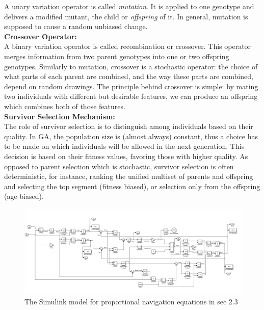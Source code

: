 A unary variation operator is called \textit{mutation}. It is applied to one genotype and delivers a modified mutant, the child or \textit{offspring} of it.
In general, mutation is supposed to cause a random unbiased change. 
\\
\textbf{Crossover Operator:}\\
A binary variation operator is called recombination or crossover. This operator merges information from two parent genotypes into one or two offspring genotypes.
Similarly to mutation, crossover is a stochastic operator: the choice of what parts of each parent are combined, and the way these parts are combined, depend on random drawings.
The principle behind crossover is simple: by mating two individuals with different but desirable features, we can produce an offspring which combines both of those features.
\\
\textbf{Survivor Selection Mechanism:}\\
The role of survivor selection is to distinguish among individuals based on their quality. In GA, the population size is (almost always) constant, thus a choice has to be made on which individuals will be allowed in the next generation. This decision is based on their fitness values, favoring those with higher quality.
As opposed to parent selection which is stochastic, survivor selection is often deterministic, for instance, ranking the unified multiset of parents and offspring and selecting the top segment (fitness biased), or selection only from the offspring (age-biased).
\\


\begin{landscape}
\begin{figure}[H]
	\centering
	\includegraphics[scale = 0.70]{fig/PNeq.PNG}
	\caption{The Simulink model for proportional navigation equations in sec 2.3}
	\label{PN eq}
\end{figure}
\end{landscape}



